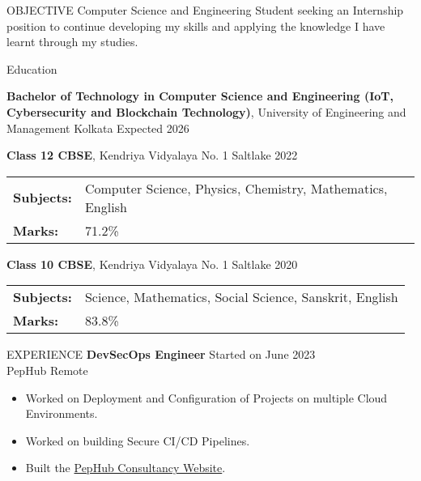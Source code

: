 \documentclass{resume}
\begin{document}
\vspace{-0.4em}

\begin{rSection}{OBJECTIVE}
{Computer Science and Engineering Student seeking an Internship position to continue developing my skills and applying the knowledge I have learnt through my studies.}

\end{rSection}
\vspace{-0.4em}
\begin{rSection}{Education}

{\bf Bachelor of Technology in Computer Science and Engineering (IoT, Cybersecurity and Blockchain Technology)}, University of Engineering and Management Kolkata \hfill {Expected 2026}\\
\vspace{-0.4em}

{\bf Class 12 CBSE}, Kendriya Vidyalaya No. 1 Saltlake \hfill {2022}\\
\begin{tabular}{>{\bfseries}l l}
Subjects: & Computer Science, Physics, Chemistry, Mathematics, English \\
Marks: & 71.2\%
\end{tabular}

{\bf Class 10 CBSE}, Kendriya Vidyalaya No. 1 Saltlake \hfill {2020}
\begin{tabular}{>{\bfseries}l l}
Subjects: & Science, Mathematics, Social Science, Sanskrit, English \\
Marks: & 83.8\%
\end{tabular}
\end{rSection}
\vspace{-0.4em}

\begin{rSection}{EXPERIENCE}
    {\bf DevSecOps Engineer} \hfill {Started on June 2023}\\
    PepHub \hfill {Remote}
    \begin{itemize}
        \item {Worked on Deployment and Configuration of Projects on multiple Cloud Environments.}
        \vspace{-0.4em}
        \item {Worked on building Secure CI/CD Pipelines.}
        \vspace{-0.4em}
        \item {Built the {\href{https://consultancy.pephub.tech}{PepHub Consultancy Website}}.}
    \end{itemize}
\end{rSection}
\end{document}
